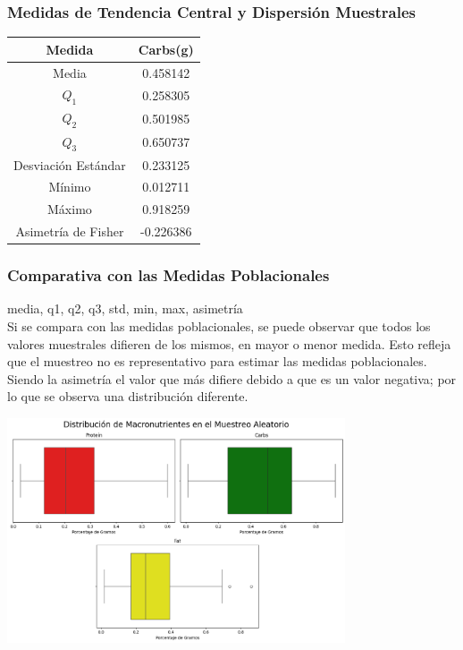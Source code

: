 \documentclass[12pt,a4paper]{article}
\begin{document}
    \subsubsection{Medidas de Tendencia Central y Dispersión Muestrales}
        \begin{center}
            \begin{tabular}{|c|c|}
                \hline
                Medida & Carbs(g) \\
                \hline
                Media & 0.458142  \\
                $Q_1$ & 0.258305 \\
                $Q_2$ & 0.501985 \\
                $Q_3$ & 0.650737 \\
                Desviación Estándar & 0.233125 \\
                Mínimo & 0.012711 \\
                Máximo & 0.918259 \\
                Asimetría de Fisher & -0.226386 \\
                \hline
            \end{tabular}
        \end{center}

    \subsubsection{Comparativa con las Medidas Poblacionales}
        media, q1, q2, q3, std, min, max, asimetría\\
        Si se compara con las medidas poblacionales, se puede observar que todos 
        los valores muestrales difieren de los mismos, en mayor o menor medida. 
        Esto refleja que el muestreo no es representativo para estimar las medidas 
        poblacionales. Siendo la asimetría el valor que más difiere debido a que es 
        un valor negativa; por lo que se observa una distribución diferente.
        \begin{center}
            \includegraphics[width=0.75\textwidth]{Resources/3_02_plot_01.png}
        \end{center}

\newpage
\end{document}
